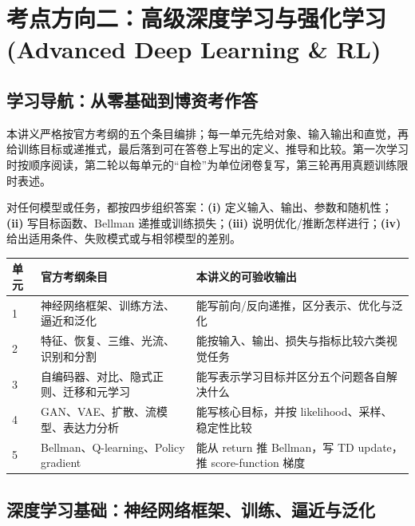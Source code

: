 \chapter{考点方向二：高级深度学习与强化学习 (Advanced Deep Learning \& RL)}
\label{ch:deep_rl}

\section*{学习导航：从零基础到博资考作答}

本讲义严格按官方考纲的五个条目编排；每一单元先给对象、输入输出和直觉，再给训练目标或递推式，最后落到可在答卷上写出的定义、推导和比较。第一次学习时按顺序阅读，第二轮以每单元的“自检”为单位闭卷复写，第三轮再用真题训练限时表述。

\begin{teaching}[统一答题框架]
对任何模型或任务，都按四步组织答案：\textbf{(i)} 定义输入、输出、参数和随机性；\textbf{(ii)} 写目标函数、Bellman 递推或训练损失；\textbf{(iii)} 说明优化/推断怎样进行；\textbf{(iv)} 给出适用条件、失败模式或与相邻模型的差别。
\end{teaching}

\begin{center}
\small
\begin{tabular}{p{}p{}p{}}
\toprule
单元 & 官方考纲条目 & 本讲义的可验收输出 \\
\midrule
1 & 神经网络框架、训练方法、逼近和泛化 & 能写前向/反向递推，区分表示、优化与泛化 \\
2 & 特征、恢复、三维、光流、识别和分割 & 能按输入、输出、损失与指标比较六类视觉任务 \\
3 & 自编码器、对比、隐式正则、迁移和元学习 & 能写表示学习目标并区分五个问题各自解决什么 \\
4 & GAN、VAE、扩散、流模型、表达力分析 & 能写核心目标，并按 likelihood、采样、稳定性比较 \\
5 & Bellman、Q-learning、Policy gradient & 能从 return 推 Bellman，写 TD update，推 score-function 梯度 \\
\bottomrule
\end{tabular}
\end{center}

\section{深度学习基础：神经网络框架、训练、逼近与泛化}


